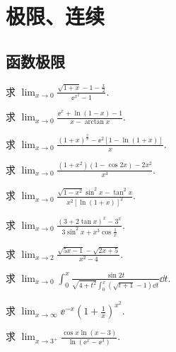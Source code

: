 \section{极限、连续}
	\subsection{函数极限}
	\begin{ti}
		求 $\lim_{x\to 0} \frac{\sqrt{1+x} - 1 - \frac{x}{2}}{\ee^{x^{2}}-1}$.
	\end{ti}

	\begin{ti}
		求 $\lim_{x \to 0} \frac{\ee^{x} + \ln(1 - x) - 1}{x - \arctan x}$.
	\end{ti}

	\begin{ti}
		求 $\lim_{x \to 0} \frac{(1+x)^{\frac{2}{x}} - \ee^{2}[1 - \ln(1+x)]}{x}$.
	\end{ti}

	\begin{ti}
		求 $\lim_{x \to 0} \frac{\left(1 + x^{2}\right)(1 - \cos 2x) - 2x^{2}}{x^{4}}$.
	\end{ti}

	\begin{ti}
		求 $\lim_{x \to 0} \frac{\sqrt{1-x^{2}} \sin^{2}x - \tan^{2}x }{x^{2}[\ln(1+x)]^{2}}$.
	\end{ti}

	\begin{ti}
		求 $\lim_{x \to 0} \frac{(3 + 2 \tan x)^{x} - 3^{x}}{3 \sin^{2}x + x^{3} \cos\frac{1}{x}}$.
	\end{ti}

	\begin{ti}
		求 $\lim_{x \to 2}\frac{\sqrt{5x - 1} - \sqrt{2x + 5}}{x^{2} - 4}$.
	\end{ti}

	\begin{ti}
		求 $\lim_{x \to 0}\int_{0}^{x} \frac{\sin 2t}{\sqrt{4+t^{2}}\int_{0}^{x} \left(\sqrt{t+1} - 1\right)\dd{t}} \dd{t}$.
	\end{ti}

	\begin{ti}
		求 $\lim_{x \to \infty} \ee^{-x} \left( 1 + \frac{1}{x} \right)^{x^{2}}$.
	\end{ti}

	\begin{ti}
		求 $\lim_{x \to 3^{+}} \frac{\cos x \ln (x - 3)}{\ln\left( \ee^{x} - \ee^{3} \right)}$.
	\end{ti}

